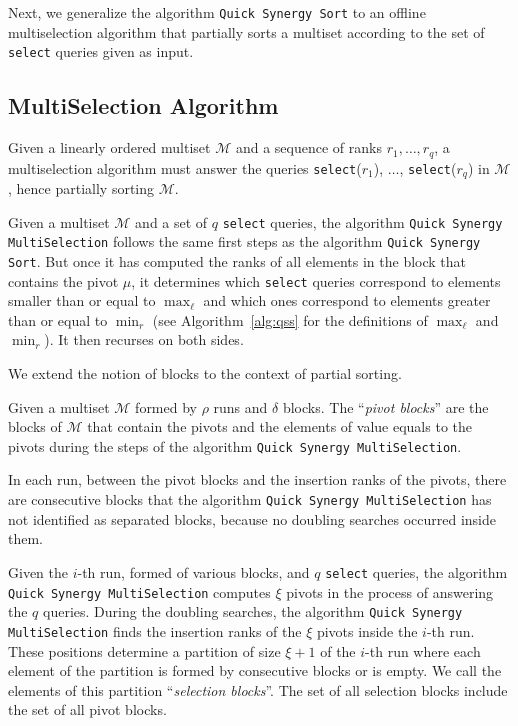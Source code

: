 Next, we generalize the algorithm \texttt{Quick Synergy Sort} to an
offline multiselection algorithm that partially sorts a multiset according to the set
of \texttt{select} queries given as input.

\subsection{MultiSelection Algorithm}
\label{sec:multiselect}

Given a linearly ordered multiset $\mathcal{M}$ and a sequence of
ranks $r_1, \dots, r_q$, a multiselection algorithm must answer the
queries \texttt{select}($r_1$), $\dots$, \texttt{select}($r_q$) in
$\mathcal{M}$, hence partially sorting $\mathcal{M}$.

Given a multiset $\mathcal{M}$ and a set of $q$ \texttt{select}
queries, the algorithm \texttt{Quick Synergy MultiSelection}
follows the same first steps as the algorithm \texttt{Quick Synergy
  Sort}. But once it has computed the ranks of all elements in the block that
contains the pivot $\mu$, it determines which \texttt{select} queries
correspond to elements smaller than or equal to $\max_\ell$ and which
ones correspond to elements greater than or equal to $\min_r$ (see
Algorithm~\ref{alg:qss} for the definitions of $\max_\ell$ and
$\min_r$). It then recurses on both sides.

We extend the notion of blocks to the context of partial sorting.

\begin{definition}
  Given a multiset $\mathcal{M}$ formed by $\rho$ runs and $\delta$
  blocks. The ``\emph{pivot blocks}'' are the blocks of $\mathcal{M}$
  that contain the pivots and the elements of value equals to the
  pivots during the steps of the algorithm \texttt{Quick Synergy
    MultiSelection}.
\end{definition}

In each run, between the pivot blocks and the insertion ranks of the
pivots, there are consecutive blocks that the algorithm \texttt{Quick Synergy
  MultiSelection} has not identified as separated blocks, because
no doubling searches occurred inside them.
 
\begin{definition}
  Given the $i$-th run, formed of various blocks, and $q$
  \texttt{select} queries, the algorithm \texttt{Quick Synergy
    MultiSelection} computes $\xi$ pivots in the process of
  answering the $q$ queries. During the doubling searches,
  the algorithm \texttt{Quick Synergy MultiSelection} finds the insertion ranks
  of the $\xi$ pivots inside the $i$-th run. These positions determine
  a partition of size $\xi+1$ of the $i$-th run where each element of
  the partition is formed by consecutive blocks or is empty. We call
  the elements of this partition ``\emph{selection blocks}''. The
  set of all selection blocks include the set of all pivot blocks.
\end{definition}

